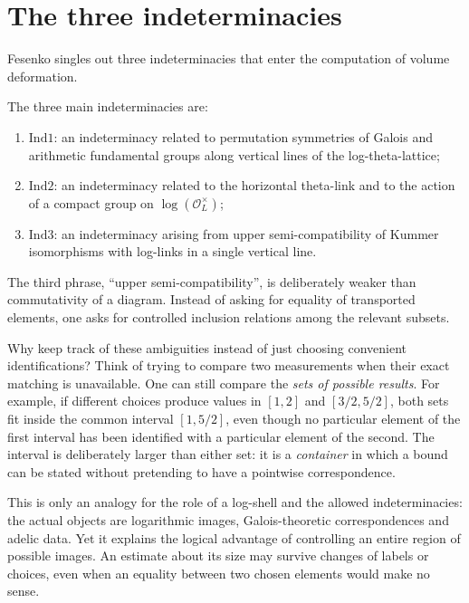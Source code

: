 \section{The three indeterminacies}

Fesenko singles out three indeterminacies that enter the computation of volume deformation.

\begin{definition}
The three main indeterminacies are:
\begin{enumerate}
  \item \(\mathrm{Ind1}\): an indeterminacy related to permutation symmetries of Galois and arithmetic fundamental groups along vertical lines of the log-theta-lattice;
  \item \(\mathrm{Ind2}\): an indeterminacy related to the horizontal theta-link and to the action of a compact group on \(\log(\mathcal O_L^{\times})\);
  \item \(\mathrm{Ind3}\): an indeterminacy arising from upper semi-compatibility of Kummer isomorphisms with log-links in a single vertical line.
\end{enumerate}
\end{definition}

The third phrase, ``upper semi-compatibility'', is deliberately weaker than commutativity of a diagram.  Instead of asking for equality of transported elements, one asks for controlled inclusion relations among the relevant subsets.

Why keep track of these ambiguities instead of just choosing convenient identifications? Think of trying to compare two measurements when their exact matching is unavailable. One can still compare the \emph{sets of possible results}. For example, if different choices produce values in $[1,2]$ and $[3/2,5/2]$, both sets fit inside the common interval $[1,5/2]$, even though no particular element of the first interval has been identified with a particular element of the second. The interval is deliberately larger than either set: it is a \emph{container} in which a bound can be stated without pretending to have a pointwise correspondence.

This is only an analogy for the role of a log-shell and the allowed indeterminacies: the actual objects are logarithmic images, Galois-theoretic correspondences and adelic data. Yet it explains the logical advantage of controlling an entire region of possible images. An estimate about its size may survive changes of labels or choices, even when an equality between two chosen elements would make no sense.

